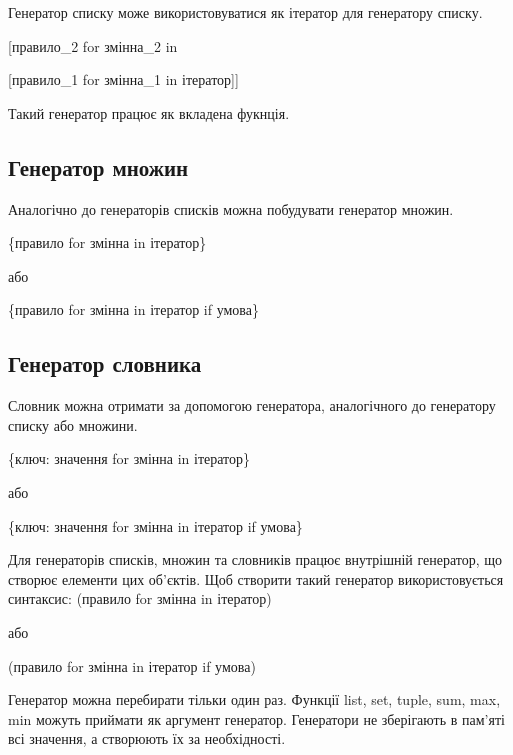\begin{frame}
Генератор списку може використовуватися як ітератор для генератору списку.

\vspace{1cm}

\LARGE{[правило\_2 for змінна\_2 in 

[правило\_1 for змінна\_1 in ітератор]]}

\vspace{1cm}

\normalsize Такий генератор працює як вкладена фукнція.

\end{frame}

 \subsection{Генератор множин} 
\begin{frame}
Аналогічно до генераторів списків можна побудувати генератор множин.

\LARGE{\{правило for змінна in ітератор\}}

\normalsize або

\LARGE{\{правило for змінна in ітератор if умова\}}

\end{frame}

 \subsection{Генератор словника} 
\begin{frame}
Словник можна отримати за допомогою генератора, аналогічного до генератору списку або множини.

\Large{\{ключ: значення for змінна in ітератор\}}

\normalsize або

\Large{\{ключ: значення for змінна in ітератор if умова\}}

\end{frame}

\begin{frame}
Для генераторів списків, множин та словників працює внутрішній генератор, що створює елементи цих об'єктів. Щоб створити такий генератор використовується синтаксис:
\Large{(правило for змінна in ітератор)}

\normalsize або

\Large{(правило for змінна in ітератор if умова)}

\normalsize Генератор можна перебирати тільки один раз. Функції list, set, tuple, sum, max, min можуть приймати як аргумент генератор. Генератори не зберігають в пам'яті всі значення, а створюють їх за необхідності.


\end{frame}

